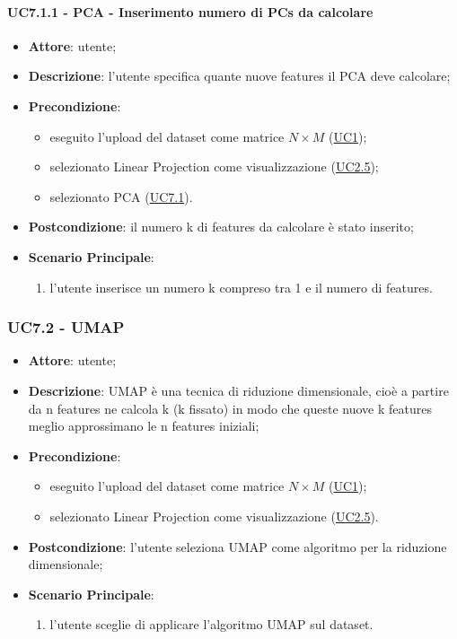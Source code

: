     \paragraph{UC7.1.1 - PCA - Inserimento numero di PCs da calcolare}
    \label{uc7.1.1}
    \begin{itemize}
    \item \textbf{Attore}: utente;
    \item \textbf{Descrizione}: l'utente specifica quante nuove features il PCA deve calcolare;
    \item \textbf{Precondizione}: 
    \begin{itemize}
        \item eseguito l'upload del dataset come matrice $N\times M$ (\hyperref[uc1]{UC1});
        \item selezionato Linear Projection come visualizzazione (\hyperref[uc2.5]{UC2.5});
        \item selezionato PCA (\hyperref[uc7.1]{UC7.1}).
    \end{itemize}  
    \item \textbf{Postcondizione}: il numero k di features da calcolare è stato inserito;
    \item \textbf{Scenario Principale}: 
    \begin{enumerate}
        \item l'utente inserisce un numero k compreso tra 1 e il numero di features.
    \end{enumerate}  
    \end{itemize}
    
    \subsubsection{UC7.2 - UMAP}
    \label{uc7.2}
    \begin{itemize}
    \item \textbf{Attore}: utente;
    \item \textbf{Descrizione}: UMAP è una tecnica di riduzione dimensionale, cioè a partire da n features ne calcola k (k fissato) in modo che queste nuove k features meglio approssimano le n features iniziali;
    \item \textbf{Precondizione}: 
    \begin{itemize}
        \item eseguito l'upload del dataset come matrice $N\times M$ (\hyperref[uc1]{UC1});
        \item selezionato Linear Projection come visualizzazione (\hyperref[uc2.5]{UC2.5}).
    \end{itemize}  
    \item \textbf{Postcondizione}: l'utente seleziona UMAP come algoritmo per la riduzione dimensionale;
    \item \textbf{Scenario Principale}: 
    \begin{enumerate}
        \item l'utente sceglie di applicare l'algoritmo UMAP sul dataset.
    \end{enumerate}
    \end{itemize}
    
